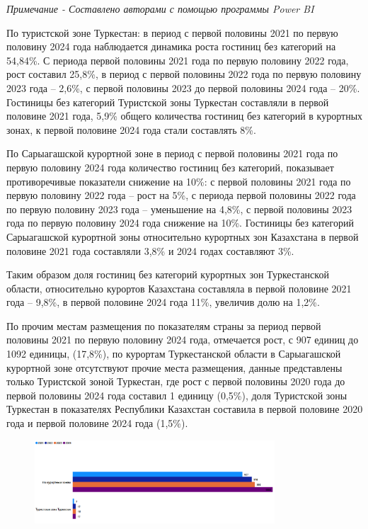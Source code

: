 \emph{Примечание - Составлено авторами с помощью программы Power BI}

По туристской зоне Туркестан: в период с первой половины 2021 по первую
половину 2024 года наблюдается динамика роста гостиниц без категорий на
54,84\%. С периода первой половины 2021 года по первую половину 2022
года, рост составил 25,8\%, в период с первой половины 2022 года по
первую половину 2023 года -- 2,6\%, с первой половины 2023 до первой
половины 2024 года -- 20\%. Гостиницы без категорий Туристской зоны
Туркестан составляли в первой половине 2021 года, 5,9\% общего
количества гостиниц без категорий в курортных зонах, к первой половине
2024 года стали составлять 8\%.

По Сарыагашской курортной зоне в период с первой половины 2021 года по
первую половину 2024 года количество гостиниц без категорий, показывает
противоречивые показатели снижение на 10\%: с первой половины 2021 года
по первую половину 2022 года -- рост на 5\%, с периода первой половины
2022 года по первую половину 2023 года -- уменьшение на 4,8\%, с первой
половины 2023 года по первую половину 2024 года снижение на 10\%.
Гостиницы без категорий Сарыагашской курортной зоны относительно
курортных зон Казахстана в первой половине 2021 года составляли 3,8\% и
2024 годах составляют 3\%.

Таким образом доля гостиниц без категорий курортных зон Туркестанской
области, относительно курортов Казахстана составляла в первой половине
2021 года -- 9,8\%, в первой половине 2024 года 11\%, увеличив долю на
1,2\%.

По прочим местам размещения по показателям страны за период первой
половины 2021 по первую половину 2024 года, отмечается рост, с 907
единиц до 1092 единицы, (17,8\%), по курортам Туркестанской области в
Сарыагашской курортной зоне отсутствуют прочие места размещения, данные
представлены только Туристской зоной Туркестан, где рост с первой
половины 2020 года до первой половины 2024 года составил 1 единицу
(0,5\%), доля Туристской зоны Туркестан в показателях Республики
Казахстан составила в первой половине 2020 года и первой половине 2024
года (1,5\%).


\begin{figure}[H]
	\centering
	\includegraphics[width=0.8\textwidth]{media/ekon2/image4}
	\caption*{}
\end{figure}


